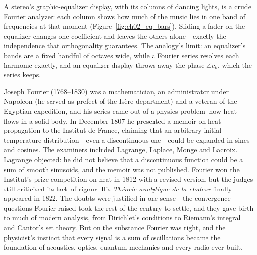 
\begin{analogy}
A stereo's graphic-equalizer display, with its columns of dancing lights, is a crude Fourier
analyzer: each column shows how much of the music lies in one band of frequencies at that moment
(Figure~\ref{fig:ch02_eq_bars}). Sliding a fader on the equalizer changes one coefficient and leaves
the others alone---exactly the independence that orthogonality guarantees. The analogy's limit: an
equalizer's bands are a fixed handful of octaves wide, while a Fourier series resolves each harmonic
exactly, and an equalizer display throws away the phase $\angle c_k$, which the series keeps.
\end{analogy}


\begin{history}
Joseph Fourier (1768--1830) was a mathematician, an administrator under Napoleon (he served as
prefect of the Is\`ere department) and a veteran of the Egyptian expedition, and his series came
out of a physics problem: how heat flows in a solid body. In December 1807 he presented a memoir
on heat propagation to the Institut de France, claiming that an arbitrary initial temperature
distribution---even a discontinuous one---could be expanded in sines and cosines. The examiners
included Lagrange, Laplace, Monge and Lacroix. Lagrange objected: he did not believe that a
discontinuous function could be a sum of smooth sinusoids, and the memoir was not published. Fourier
won the Institut's prize competition on heat in 1812 with a revised version, but the
judges still criticised its lack of rigour. His \emph{Th\'eorie analytique de la chaleur} finally
appeared in 1822. The doubts were justified in one sense---the convergence questions Fourier raised
took the rest of the century to settle, and they gave birth to much of modern analysis, from
Dirichlet's conditions to Riemann's integral and Cantor's set theory. But on the substance Fourier was
right, and the physicist's instinct that every signal is a sum of oscillations became the
foundation of acoustics, optics, quantum mechanics and every radio ever built.
\end{history}

